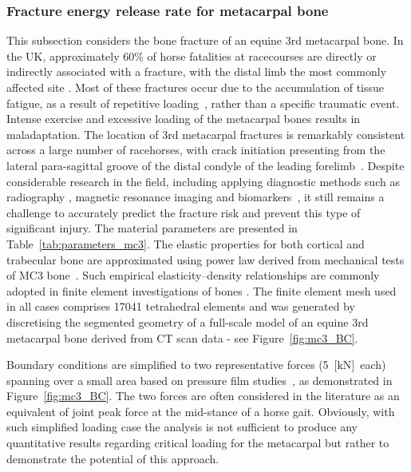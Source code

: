 \documentclass[onecolumn]{svjour3}
\begin{document}
\subsubsection{Fracture energy release rate for metacarpal bone} 
\label{sec:mc3_release_eng}
% 
This subsection considers the bone fracture of an equine 3rd metacarpal bone. 
In the UK, approximately 60\% of horse fatalities at racecourses are directly or indirectly associated with a fracture, with the distal limb the most commonly affected site \cite{parkin2004risk}.
Most of these fractures occur due to the accumulation of tissue fatigue, as a result of repetitive loading~\cite{Parkin2005}, rather than a specific traumatic event. 
Intense exercise and excessive loading of the metacarpal bones results in maladaptation. 
The location of 3rd metacarpal fractures is remarkably consistent across a large number of racehorses,  with crack initiation presenting from 
the lateral para-sagittal groove of the distal condyle of the leading forelimb~\cite{jacklin2012frequency, parkin2006analysis}.
Despite considerable research in the field, including applying diagnostic methods such as radiography 
\cite{bogers2016quantitative, crijns2014intramodality, loughridge2017qualitative}, magnetic resonance imaging 
\cite{tranquille2017MRI} and biomarkers~\cite{mcilwraith2005use}, it still remains a challenge to accurately predict the fracture risk 
and prevent this type of significant injury.
% 
The material parameters are presented in Table~\ref{tab:parameters_mc3}. The elastic properties for both cortical and trabecular bone are approximated using power law derived from mechanical tests of MC3 bone~\cite{Les1994}. 
Such empirical elasticity–density relationships are commonly adopted in finite element investigations of bones \citep{helgason2008mathematical}.
The finite element mesh used in all cases comprises 17041 tetrahedral elements and was generated by discretising the segmented geometry of a full-scale model of an equine 3rd metacarpal bone derived from CT scan data - see Figure~\ref{fig:mc3_BC}.

Boundary conditions are simplified to two representative forces (5~$\text{[kN]}$~each) spanning over a small area based on pressure film studies~\cite{Brama2001}, as demonstrated in Figure~\ref{fig:mc3_BC}. 
The two forces are often considered in the literature as an equivalent of joint peak force at the mid-stance of a horse gait. Obviously, with such simplified loading case the analysis is not sufficient to produce any quantitative results regarding critical loading for the metacarpal but rather to demonstrate the potential of this approach. 
\end{document}

